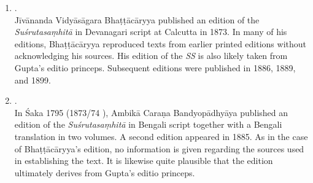 \documentclass[12pt]{article}
\begin{document}
\begin{enumerate}
	Gupta did not indicate the manuscripts or other sources used in preparing the text. The edition was reprinted in four volumes in Calcutta in 1868, and a second edition in two volumes appeared in 1874.[311]{HIMT}
	
	
	
	
	
	\item \textbf{}.\\
	Jīvānanda Vidyāsāgara Bhaṭṭācāryya published an edition of the \emph{Suśrutasaṃhitā} in Devanagari script at Calcutta in 1873. In many of his editions, Bhaṭṭācāryya reproduced texts from earlier printed editions without acknowledging his sources. 
	His edition of the \emph{SS} is also likely taken from Gupta's editio princeps.
	Subsequent editions were published in 1886, 1889, and 1899.
	
	
	
	
	\item \textbf{}.\\
	In Śaka 1795 (1873/74 \AD), Ambikā Caraṇa Bandyopādhyāya published an edition of the \emph{Suśrutasaṃhitā} in Bengali script together with a Bengali translation in two volumes. A second edition appeared in 1885. As in the case of Bhaṭṭācāryya's edition, no information is given regarding the sources used in establishing the text. It is likewise quite plausible that the edition ultimately derives from Gupta's editio princeps. 
	
\end{enumerate}
\end{document}
